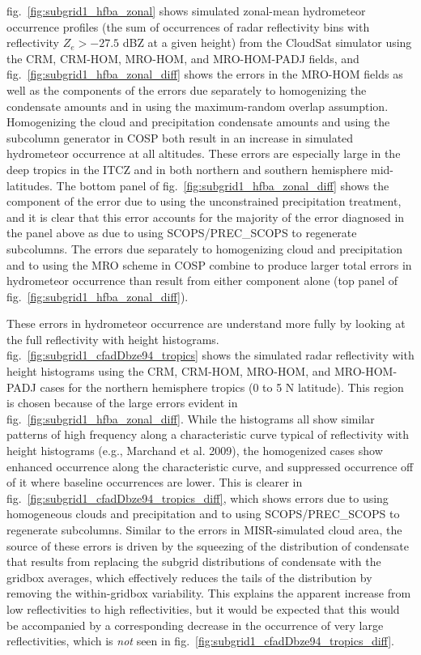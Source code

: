 fig.~\ref{fig:subgrid1_hfba_zonal} shows simulated zonal-mean
hydrometeor occurrence profiles (the sum of occurrences of radar
reflectivity bins with reflectivity \(Z_e > -27.5\) dBZ at a given
height) from the CloudSat simulator using the CRM, CRM-HOM, MRO-HOM, and
MRO-HOM-PADJ fields, and fig.~\ref{fig:subgrid1_hfba_zonal_diff} shows
the errors in the MRO-HOM fields as well as the components of the errors
due separately to homogenizing the condensate amounts and in using the
maximum-random overlap assumption. Homogenizing the cloud and
precipitation condensate amounts and using the subcolumn generator in
COSP both result in an increase in simulated hydrometeor occurrence at
all altitudes. These errors are especially large in the deep tropics in
the ITCZ and in both northern and southern hemisphere mid-latitudes. The
bottom panel of fig.~\ref{fig:subgrid1_hfba_zonal_diff} shows the
component of the error due to using the unconstrained precipitation
treatment, and it is clear that this error accounts for the majority of
the error diagnosed in the panel above as due to using SCOPS/PREC\_SCOPS
to regenerate subcolumns. The errors due separately to homogenizing
cloud and precipitation and to using the MRO scheme in COSP combine to
produce larger total errors in hydrometeor occurrence than result from
either component alone (top panel of
fig.~\ref{fig:subgrid1_hfba_zonal_diff}).

These errors in hydrometeor occurrence are understand more fully by
looking at the full reflectivity with height histograms.
fig.~\ref{fig:subgrid1_cfadDbze94_tropics} shows the simulated radar
reflectivity with height histograms using the CRM, CRM-HOM, MRO-HOM, and
MRO-HOM-PADJ cases for the northern hemisphere tropics (0 to 5 N
latitude). This region is chosen because of the large errors evident in
fig.~\ref{fig:subgrid1_hfba_zonal_diff}. While the histograms all show
similar patterns of high frequency along a characteristic curve typical
of reflectivity with height histograms (e.g., Marchand et al. 2009), the
homogenized cases show enhanced occurrence along the characteristic
curve, and suppressed occurrence off of it where baseline occurrences
are lower. This is clearer in
fig.~\ref{fig:subgrid1_cfadDbze94_tropics_diff}, which shows errors due
to using homogeneous clouds and precipitation and to using
SCOPS/PREC\_SCOPS to regenerate subcolumns. Similar to the errors in
MISR-simulated cloud area, the source of these errors is driven by the
squeezing of the distribution of condensate that results from replacing
the subgrid distributions of condensate with the gridbox averages, which
effectively reduces the tails of the distribution by removing the
within-gridbox variability. This explains the apparent increase from low
reflectivities to high reflectivities, but it would be expected that
this would be accompanied by a corresponding decrease in the occurrence
of very large reflectivities, which is \emph{not} seen in
fig.~\ref{fig:subgrid1_cfadDbze94_tropics_diff}.

